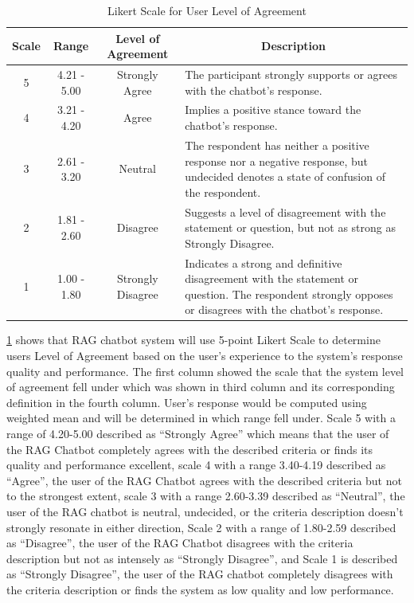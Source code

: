 \begin{refsection}
\begin{table}[H] %
    \centering
    \caption{Likert Scale for User Level of Agreement}
    \label{tab:likert_scale}
    \footnotesize
    \begin{tabular}{cccp{7cm}}
        \hline
        \textbf{Scale} & \textbf{Range} & \textbf{Level of Agreement} & \multicolumn{1}{c}{\textbf{Description}} \\
        \hline
                5 & 4.21 - 5.00 & Strongly Agree & The participant strongly supports or agrees with the chatbot's response.\\
        \hline
                4 & 3.21 - 4.20 & Agree & Implies a positive stance toward the chatbot's response. \\
        \hline
                3 & 2.61 - 3.20 & Neutral & The respondent has neither a positive response nor a negative response, but undecided denotes a state of confusion of the respondent. \\
        \hline
                2 & 1.81 - 2.60 & Disagree & Suggests a level of disagreement with the statement or question, but not as strong as Strongly Disagree.\\
        \hline
                1 & 1.00 - 1.80 & Strongly Disagree & Indicates a strong and definitive disagreement with the statement or question. The respondent strongly opposes or disagrees with the chatbot's response.\\
        \hline
    \end{tabular}
\end{table}

\ref{tab:likert_scale} shows that RAG chatbot system will use 5-point Likert Scale to determine users Level of Agreement based on the user’s experience to the system’s response quality and performance. The first column showed the scale that the system level of agreement fell under which was shown in third column and its corresponding definition in the fourth column. User’s response would be computed using weighted mean and will be determined in which range fell under. Scale 5 with a range of 4.20-5.00 described as “Strongly Agree” which means that the user of the RAG Chatbot completely agrees with the described criteria or finds its quality and performance excellent, scale 4 with a range 3.40-4.19 described as “Agree”, the user of the RAG Chatbot agrees with the described criteria but not to the strongest extent, scale 3 with a range 2.60-3.39 described as “Neutral”, the user of the RAG chatbot is neutral, undecided, or the  criteria description doesn’t strongly resonate in either direction, Scale 2 with a range of 1.80-2.59 described as “Disagree”, the user of the RAG Chatbot disagrees with the criteria description but not as intensely as “Strongly Disagree”, and Scale 1 is described as “Strongly Disagree”, the user of the RAG chatbot completely disagrees with the criteria description or finds the system as low quality and low performance.


\end{refsection}
